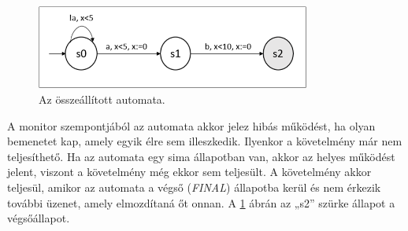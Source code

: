 \begin{figure}[!ht]
    \centering
    \includegraphics[width=90mm, keepaspectratio]{figures/9abra.png}
    \caption{Az összeállított automata.}
    \label{created_automaton}
\end{figure}

A monitor szempontjából az automata akkor jelez hibás működést, ha olyan bemenetet kap, amely egyik élre sem illeszkedik.
Ilyenkor a követelmény már nem teljesíthető.
Ha az automata egy sima állapotban van, akkor az helyes működést jelent, viszont a követelmény még ekkor sem teljesült.
A követelmény akkor teljesül, amikor az automata a végső (\textit{FINAL}) állapotba kerül és nem érkezik további üzenet, amely elmozdítaná őt onnan.
A \ref{created_automaton} ábrán az „s2” szürke állapot a végsőállapot.